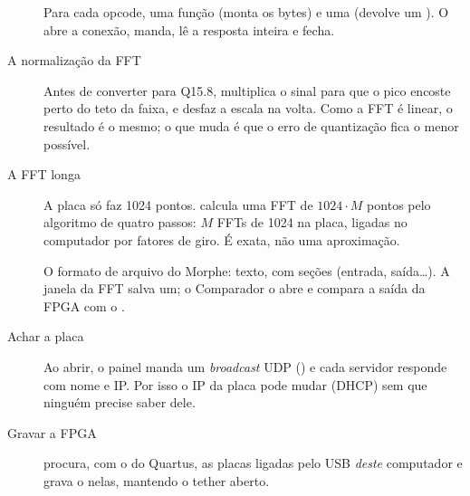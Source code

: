\documentclass[11pt,a4paper,oneside]{article}
\begin{document}
\begin{center}
\end{center}

\begin{description}
  \item[] Para cada opcode, uma função
     (monta os bytes) e uma 
    (devolve um ). O  abre a conexão, manda,
    lê a resposta inteira e fecha.
  \item[A normalização da FFT] Antes de converter para Q15.8,
     multiplica o sinal para que o pico encoste perto do
    teto da faixa, e  desfaz a escala na volta. Como
    a FFT é linear, o resultado é o mesmo; o que muda é que o erro de
    quantização fica o menor possível.
  \item[A FFT longa] A placa só faz 1024 pontos.  calcula uma
    FFT de \(1024 \cdot M\) pontos pelo algoritmo de quatro passos: \(M\) FFTs
    de 1024 na placa, ligadas no computador por fatores de giro. É exata, não
    uma aproximação.
  \item[] O formato de arquivo do Morphe: texto, com seções
    (entrada, saída\ldots). A janela da FFT salva um; o Comparador o abre e
    compara a saída da FPGA com o .
  \item[Achar a placa] Ao abrir, o painel manda um \emph{broadcast} UDP
    () e cada servidor responde com nome e IP. Por isso o
    IP da placa pode mudar (DHCP) sem que ninguém precise saber dele.
  \item[Gravar a FPGA]  procura, com o
     do Quartus, as placas ligadas pelo USB \emph{deste}
    computador e grava o  nelas, mantendo o tether aberto.
\end{description}
\end{document}
